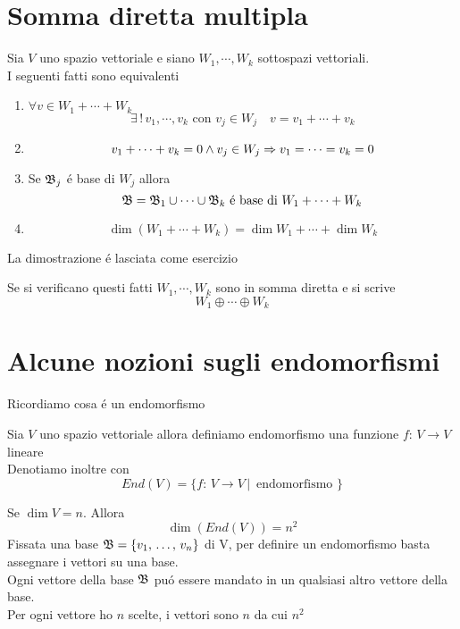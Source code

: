 %
\section{Somma diretta multipla}
\begin{prop} \label{sommamultipla}Sia $V$ uno spazio vettoriale e siano $W_1 ,\cdots, W_k$ sottospazi vettoriali.\\
I seguenti fatti sono equivalenti
\begin{enumerate}
\item $\forall v \in W_1 + \cdots + W_k $
$$\exists \, ! \,  v_1, \cdots , v_k \text{ con } v_j \in W_j \quad v=v_1+\cdots+v_k$$
\item 
$$ v_1+ \cdots + v_k =0 \wedge v_j \in W_j \Rightarrow v_1=\cdots=v_k=0 $$
\item Se $\mathfrak{B}_j$ \'e base di $W_j$ allora $$ \mathfrak{B}=\mathfrak{B}_1\cup \cdots \cup \mathfrak{B}_k \text{ \'e base di  } W_1+ \cdots + W_k$$
\item $$\dim ( W_1 + \cdots + W_k ) =\dim W_1 + \cdots + \dim W_k $$
\end{enumerate}
La dimostrazione \'e lasciata come esercizio
\end{prop}
\begin{defn}\bianco
Se si verificano questi fatti $W_1, \cdots , W_k $ sono in somma diretta e si scrive 
$$ W_1 \oplus \cdots \oplus W_k $$
\end{defn}
\spazio  
\newpage

\section{Alcune nozioni sugli endomorfismi }
Ricordiamo cosa \'e un endomorfismo
\begin{defn}[Endomorfismo]\bianco
Sia $V$ uno spazio vettoriale allora definiamo endomorfismo una funzione
$ f: \, V \to V $ lineare\\
Denotiamo inoltre con 
$$ End(V) = \{ f :\, V \to V \, \vert \, \text{ endomorfismo } \} $$  
\end{defn}
\begin{prop}Se $\dim V= n $.
Allora
$$ \dim (End(V))=n^2 $$
\proof
Fissata una base $\mathfrak{B}=\{ v_1, \, \dots , \, v_n \} $ di V, per definire un endomorfismo basta assegnare i vettori su una base.\\
Ogni vettore della base $\mathfrak{B}$ pu\'o essere mandato in un qualsiasi altro vettore della base.\\Per ogni vettore ho $n$ scelte, i vettori sono $n$ da cui $n^2 $
\endproof
\end{prop}

